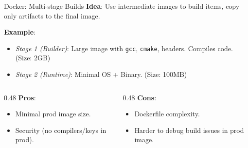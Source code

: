 \documentclass[aspectratio=169]{beamer}
\begin{document}
\begin{frame}[t]{Docker: Multi-stage Builds}
    \vspace*{-0.5cm}
    \textbf{Idea}: Use intermediate images to build items, copy only artifacts to the final image.

    \textbf{Example}:
    \begin{itemize}
        \item \textit{Stage 1 (Builder)}: Large image with \texttt{gcc}, \texttt{cmake}, headers. Compiles code. (Size: 2GB)
        \item \textit{Stage 2 (Runtime)}: Minimal OS + Binary. (Size: 100MB)
    \end{itemize}
    
    \begin{columns}[T,onlytextwidth]
        \begin{column}{0.48\textwidth}
            \textbf{Pros}:
            \begin{itemize}
                \item Minimal prod image size.
                \item Security (no compilers/keys in prod).
            \end{itemize}
        \end{column}
        \begin{column}{0.48\textwidth}
             \textbf{Cons}:
            \begin{itemize}
               \item Dockerfile complexity.
                \item Harder to debug build issues in prod image.
            \end{itemize}
        \end{column}
    \end{columns}
\end{frame}
\end{document}
